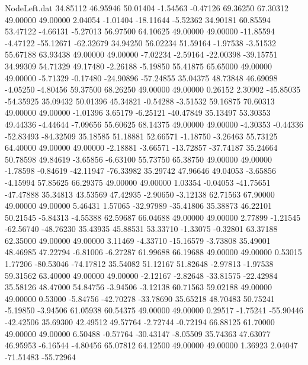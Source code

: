 \begin{filecontents}{NodeLeft.dat}
  34.85112   46.95946   50.01404    -1.54563   -0.47126   69.36250   67.30312   49.00000   49.00000    2.04054   -1.01404  -18.11644   -5.52362
  34.90181   60.85594   53.47122    -4.66131   -5.27013   56.97500   64.10625   49.00000   49.00000  -11.85594   -4.47122  -55.12671  -62.32679
  34.94250   56.02234   51.59164    -1.97538   -3.51532   55.67188   63.93438   49.00000   49.00000   -7.02234   -2.59164  -22.00398  -39.15751
  34.99309   54.71329   49.17480    -2.26188   -5.19850   55.41875   65.65000   49.00000   49.00000   -5.71329   -0.17480  -24.90896  -57.24855
  35.04375   48.73848   46.69098    -4.05250   -4.80456   59.37500   68.26250   49.00000   49.00000    0.26152    2.30902  -45.85035  -54.35925
  35.09432   50.01396   45.34821    -0.54288   -3.51532   59.16875   70.60313   49.00000   49.00000   -1.01396    3.65179   -6.25121  -40.47849
  35.13497   53.30353   49.44336    -4.44644   -7.09656   55.60625   68.14375   49.00000   49.00000   -4.30353   -0.44336  -52.83493  -84.32509
  35.18585   51.18881   52.66571    -1.18750   -3.26463   55.73125   64.40000   49.00000   49.00000   -2.18881   -3.66571  -13.72857  -37.74187
  35.24664   50.78598   49.84619    -3.65856   -6.63100   55.73750   65.38750   49.00000   49.00000   -1.78598   -0.84619  -42.11947  -76.33982
  35.29742   47.96646   49.04053    -3.65856   -4.15994   57.85625   66.29375   49.00000   49.00000    1.03354   -0.04053  -41.75651  -47.47888
  35.34813   43.53569   47.42935    -2.90650   -3.12138   62.71563   67.90000   49.00000   49.00000    5.46431    1.57065  -32.97989  -35.41806
  35.38873   46.22101   50.21545    -5.84313   -4.55388   62.59687   66.04688   49.00000   49.00000    2.77899   -1.21545  -62.56740  -48.76230
  35.43935   45.88531   53.33710    -1.33075   -0.32801   63.37188   62.35000   49.00000   49.00000    3.11469   -4.33710  -15.16579   -3.73808
  35.49001   48.46985   47.22794    -6.81006   -6.27287   61.99688   66.19688   49.00000   49.00000    0.53015    1.77206  -80.53046  -74.17812
  35.54082   51.12167   51.82648    -2.97813   -1.97538   59.31562   63.40000   49.00000   49.00000   -2.12167   -2.82648  -33.81575  -22.42984
  35.58126   48.47000   54.84756    -3.94506   -3.12138   60.71563   59.02188   49.00000   49.00000    0.53000   -5.84756  -42.70278  -33.78690
  35.65218   48.70483   50.75241    -5.19850   -3.94506   61.05938   60.54375   49.00000   49.00000    0.29517   -1.75241  -55.90446  -42.42506
  35.69300   42.49512   49.57764    -2.72744   -0.72194   66.88125   61.70000   49.00000   49.00000    6.50488   -0.57764  -30.43147   -8.05509
  35.74363   47.63077   46.95953    -6.16544   -4.80456   65.07812   64.12500   49.00000   49.00000    1.36923    2.04047  -71.51483  -55.72964

\end{filecontents}
